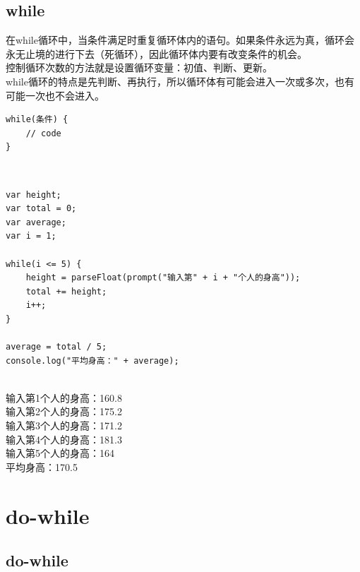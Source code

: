 \subsection{while}

在while循环中，当条件满足时重复循环体内的语句。如果条件永远为真，循环会永无止境的进行下去（死循环），因此循环体内要有改变条件的机会。 \\

控制循环次数的方法就是设置循环变量：初值、判断、更新。 \\

while循环的特点是先判断、再执行，所以循环体有可能会进入一次或多次，也有可能一次也不会进入。 \\

\begin{lstlisting}[style=htmlcssjs]
while(条件) {
    // code
}
\end{lstlisting}

 \\

\begin{lstlisting}[style=htmlcssjs]
var height;
var total = 0;
var average;
var i = 1;

while(i <= 5) {
    height = parseFloat(prompt("输入第" + i + "个人的身高"));
    total += height;
    i++;
}

average = total / 5;
console.log("平均身高：" + average);
\end{lstlisting}

\begin{tcolorbox}
	 \\
	输入第1个人的身高：160.8 \\
	输入第2个人的身高：175.2 \\
	输入第3个人的身高：171.2 \\
	输入第4个人的身高：181.3 \\
	输入第5个人的身高：164 \\
	平均身高：170.5
\end{tcolorbox}

\newpage

\section{do-while}

\subsection{do-while}

